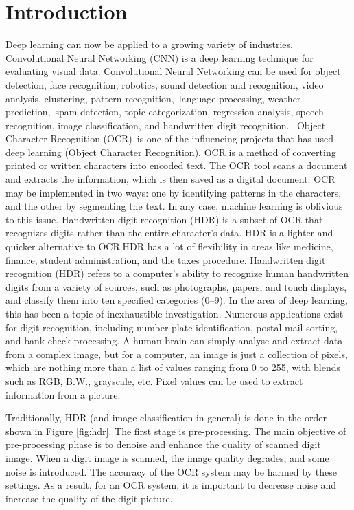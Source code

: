 \documentclass[conference]{IEEEtran}
\begin{document}
\section{Introduction}
Deep learning can now be applied to a growing variety of industries. Convolutional Neural Networking (CNN) is a deep learning technique for evaluating visual data. Convolutional Neural Networking can be used for object detection, face recognition, robotics, sound detection and recognition, video analysis, clustering, pattern recognition, language processing, weather prediction, spam detection, topic categorization, regression analysis, speech recognition, image classification, and handwritten digit recognition.
 Object Character Recognition (OCR) is one of the influencing projects that has used deep learning (Object Character Recognition). OCR is a method of converting printed or written characters into encoded text. The OCR tool scans a document and extracts the information, which is then saved as a digital document. OCR may be implemented in two ways: one by identifying patterns in the characters, and the other by segmenting the text. In any case, machine learning is oblivious to this issue. Handwritten digit recognition (HDR) is a subset of OCR that recognizes digits rather than the entire character's data. HDR is a lighter and quicker alternative to OCR.\@ HDR has a lot of flexibility in areas like medicine, finance, student administration, and the taxes procedure.
Handwritten digit recognition (HDR) refers to a computer's ability to recognize human handwritten digits from a variety of sources, such as photographs, papers, and touch displays, and classify them into ten specified categories (0--9). In the area of deep learning, this has been a topic of inexhaustible investigation. Numerous applications exist for digit recognition, including number plate identification, postal mail sorting, and bank check processing. A human brain can simply analyse and extract data from a complex image, but for a computer, an image is just a collection of pixels, which are nothing more than a list of values ranging from 0 to 255, with blends such as RGB, B.W., grayscale, etc. Pixel values can be used to extract information from a picture.
\par Traditionally, HDR (and image classification in general) is done in the order shown in Figure \ref{fig:hdr}.
The first stage is pre-processing. The main objective of pre-processing phase is to denoise and enhance the quality of scanned digit image. When a digit image is scanned, the image quality degrades, and some noise is introduced. The accuracy of the OCR system may be harmed by these settings. As a result, for an OCR system, it is important to decrease noise and increase the quality of the digit picture.
\end{document}

